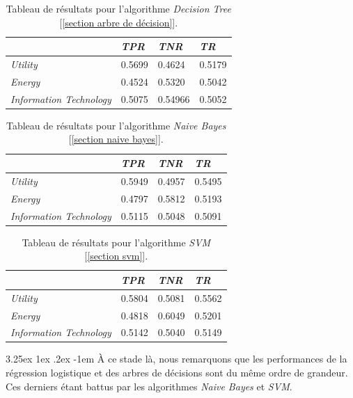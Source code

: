 \documentclass[a4paper, 11pt]{article}
\makeatletter
\renewcommand\paragraph{\@startsection{paragraph}{5}{\z@}%
  {3.25ex \@plus1ex \@minus.2ex}%
  {-1em}%
  {\normalfont\normalsize\bfseries}}
\makeatother
\begin{document}
\begin{table}[h!]
	\centering
\begin{tabular}{|l|l|l|l|}
	\hline
	\ & \textit{TPR} & \textit{TNR} & \textit{TR}\\
	\hline
	\textit{Utility} & 0.5699 & 0.4624 & 0.5179 \\
	\hline
	\textit{Energy} & 0.4524 & 0.5320 & 0.5042\\
	\hline
	\textit{Information Technology} & 0.5075 & 0.54966 & 0.5052\\
	\hline
\end{tabular}
\caption[]{Tableau de résultats pour l'algorithme \textit{Decision Tree} [\ref{section arbre de décision}].}
\end{table}



\begin{table}[h!]
	\centering
\begin{tabular}{|l|l|l|l|}
	\hline
	\ & \textit{TPR} & \textit{TNR} & \textit{TR}\\
	\hline
	\textit{Utility} & 0.5949 & 0.4957 & 0.5495 \\
	\hline
	\textit{Energy} & 0.4797 & 0.5812 & 0.5193\\
	\hline
	\textit{Information Technology} & 0.5115 & 0.5048 & 0.5091\\
	\hline
\end{tabular}
\caption[]{Tableau de résultats pour l'algorithme \textit{Naive Bayes} [\ref{section naive bayes}].}
\end{table}


\begin{table}[H]
	\centering
\begin{tabular}{|l|l|l|l|}
	\hline
	\ & \textit{TPR} & \textit{TNR} & \textit{TR}\\
	\hline
	\textit{Utility} & 0.5804 & 0.5081 & 0.5562 \\
	\hline
	\textit{Energy} & 0.4818 & 0.6049 & 0.5201\\
	\hline
	\textit{Information Technology} & 0.5142 & 0.5040 & 0.5149\\
	\hline
\end{tabular}
\caption{Tableau de résultats pour l'algorithme \textit{SVM} [\ref{section svm}].}
\end{table}


\paragraph{}
À ce stade là, nous remarquons que les performances de la régression logistique et des arbres de décisions sont du même ordre de grandeur. Ces derniers étant battus par les algorithmes \textit{Naive Bayes} et \textit{SVM}.
\end{document}

